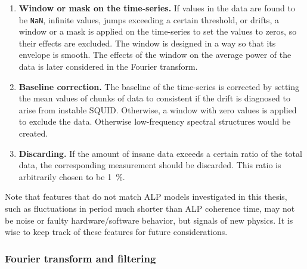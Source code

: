 \begin{enumerate}
    \item \textbf{Window or mask on the time-series.} If values in the data are found to be \texttt{NaN}, infinite values, jumps exceeding a certain threshold, or drifts, a window or a mask is applied on the time-series to set the values to zeros, so their effects are excluded. 
    The window is designed in a way so that its envelope is smooth. 
    The effects of the window on the average power of the data is later considered in the Fourier transform. 
    \item \textbf{Baseline correction.} The baseline of the time-series is corrected by setting the mean values of chunks of data to consistent if the drift is diagnosed to arise from instable SQUID. Otherwise, a window with zero values is applied to exclude the data. Otherwise low-frequency spectral structures would be created. 
    \item \textbf{Discarding.} If the amount of insane data exceeds a certain ratio of the total data, the corresponding measurement should be discarded. This ratio is arbitrarily chosen to be \SI{1}{\percent}. 
\end{enumerate}

Note that features that do not match ALP models investigated in this thesis, such as fluctuations in period much shorter than ALP coherence time, may not be noise or faulty hardware/software behavior, but signals of new physics. 
It is wise to keep track of these features for future considerations. 



\subsubsection{Fourier transform and filtering}

